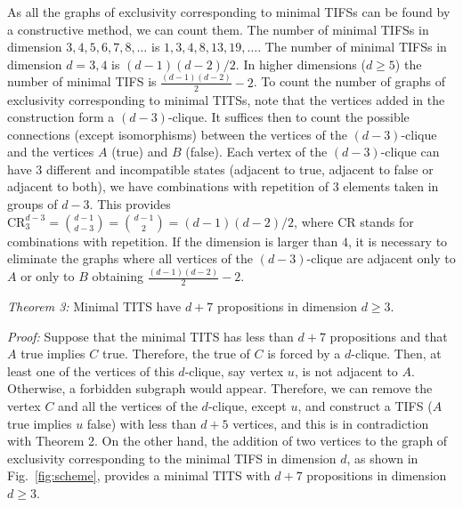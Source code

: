 \documentclass[%
 twocolumn,
 groupedaddress,
 showpacs,
 showkeys,
 preprintnumbers,
 amsmath,amssymb,
 aps,
 pra,
 longbibliography,
 floatfix,
 ]{revtex4-1}
\def\endproof{\vrule height6pt width6pt depth0pt}
\begin{document}
As all the graphs of exclusivity corresponding to minimal TIFSs can be found by a constructive method, we can count them.
The number of minimal TIFSs in dimension $ 3,4,5,6,7,8,\ldots$ is $ 1,3,4,8,13,19,\ldots $.
The number of minimal TIFSs in dimension $ d = 3,4 $ is $ (d-1) (d-2) / 2 $. In higher dimensions ($ d \geq 5 $) the number of minimal TIFS is $ \frac {(d-1) (d-2)} {2} -2 $.
To count the number of graphs of exclusivity corresponding to minimal TITSs, note that the vertices added in the construction form a $(d-3)$-clique.
It suffices then to count the possible connections (except isomorphisms) between the vertices of the $(d-3)$-clique and the vertices $A$ (true) and $B$ (false). Each vertex of the $(d-3)$-clique can have $ 3 $ different and incompatible states (adjacent to true, adjacent to false or adjacent to both), we have combinations with repetition of 3 elements taken in groups of $ d-3 $. This provides $\mathrm{CR}^{d-3}_3 = \binom{d-1}{d-3} = \binom{d-1}{2} = (d-1) (d-2) / 2 $, where $\mathrm{CR}$ stands for combinations with repetition. If the dimension is larger than $ 4 $, it is necessary to eliminate the graphs where all vertices of the $(d-3)$-clique are adjacent only to $ A $ or only to $ B $ obtaining $ \frac{(d-1) (d-2)}{2} -2 $.


{\em Theorem 3:} Minimal TITS have $d+7$ propositions in dimension $d\geq 3$.


{\em Proof:} Suppose that the minimal TITS has less than $d+7$ propositions and that $A$ true implies $C$ true.
Therefore, the true of $C$ is forced by a $d$-clique. Then, at least one of the vertices of this $d$-clique, say vertex $u$, is not adjacent to $A$. Otherwise, a forbidden subgraph would appear. Therefore, we can remove the vertex $C$ and all the vertices of the $d$-clique, except $u$, and construct a TIFS ($A$ true implies $u$ false) with less than $d+5$ vertices, and this is in contradiction with Theorem 2. On the other hand, the addition of two vertices to the graph of exclusivity corresponding to the minimal TIFS in dimension $d$, as shown in Fig.~\ref{fig:scheme}, provides a minimal TITS with $d+7$ propositions in dimension $d\geq 3$. \hfill \endproof

\end{document}
